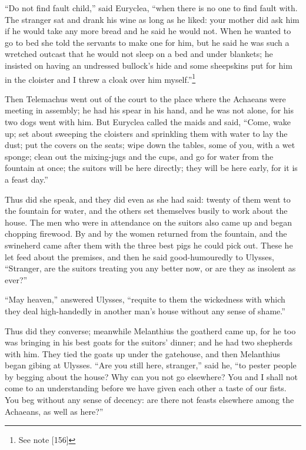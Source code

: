 “Do not find fault child,” said Euryclea, “when there is no one to find fault
with. The stranger sat and drank his wine as long as he liked: your mother did
ask him if he would take any more bread and he said he would not. When he
wanted to go to bed she told the servants to make one for him, but he said he
was such a wretched outcast that he would not sleep on a bed and under
blankets; he insisted on having an undressed bullock’s hide and some sheepskins
put for him in the cloister and I threw a cloak over him myself.”\footnote{See note [156]}

Then Telemachus went out of the court to the place where the Achaeans were
meeting in assembly; he had his spear in his hand, and he was not alone, for
his two dogs went with him. But Euryclea called the maids and said, “Come, wake
up; set about sweeping the cloisters and sprinkling them with water to lay the
dust; put the covers on the seats; wipe down the tables, some of you, with a
wet sponge; clean out the mixing-jugs and the cups, and go for water from the
fountain at once; the suitors will be here directly; they will be here early,
for it is a feast day.”

Thus did she speak, and they did even as she had said: twenty of them went to
the fountain for water, and the others set themselves busily to work about the
house. The men who were in attendance on the suitors also came up and began
chopping firewood. By and by the women returned from the fountain, and the
swineherd came after them with the three best pigs he could pick out. These he
let feed about the premises, and then he said good-humouredly to Ulysses,
“Stranger, are the suitors treating you any better now, or are they as insolent
as ever?”

“May heaven,” answered Ulysses, “requite to them the wickedness with which they
deal high-handedly in another man’s house without any sense of shame.”

Thus did they converse; meanwhile Melanthius the goatherd came up, for he too
was bringing in his best goats for the suitors’ dinner; and he had two
shepherds with him. They tied the goats up under the gatehouse, and then
Melanthius began gibing at Ulysses. “Are you still here, stranger,” said he,
“to pester people by begging about the house? Why can you not go elsewhere? You
and I shall not come to an understanding before we have given each other a
taste of our fists. You beg without any sense of decency: are there not feasts
elsewhere among the Achaeans, as well as here?”


